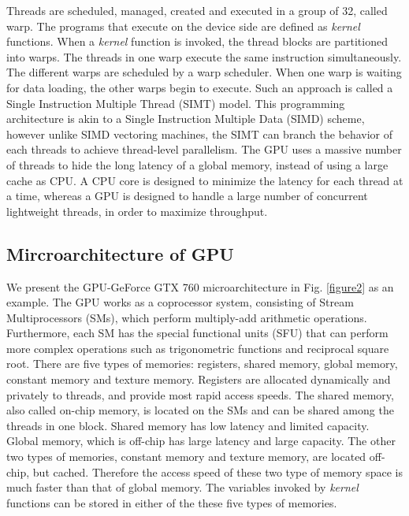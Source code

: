 \documentclass[letterpaper, 10pt, conference]{ieeeconf}
\begin{document}
Threads are scheduled, managed, created and executed in a group of 32, called warp. The programs that execute on the device side are defined as \textit{kernel} functions. When a \textit{kernel} function is invoked, the thread blocks are partitioned into warps. The threads in one warp execute the same instruction simultaneously. The different warps are scheduled by a warp scheduler. When one warp is waiting for data loading, the other warps begin to execute. Such an approach is called a Single Instruction Multiple Thread (SIMT) model. This programming architecture is akin to a Single Instruction Multiple Data (SIMD) scheme, however unlike SIMD vectoring machines, the SIMT can branch the behavior of each threads to achieve thread-level parallelism. The GPU uses a massive number of threads to hide the long latency of a global memory, instead of using a large cache as CPU. A CPU core is designed to minimize the latency for each thread at a time, whereas a GPU is designed to handle a large number of concurrent lightweight threads, in order to maximize throughput.
\subsection{Mircroarchitecture of GPU} 
We present the GPU-GeForce GTX 760 microarchitecture in Fig. \ref{figure2} as an example. The GPU works as a coprocessor system, consisting of Stream Multiprocessors (SMs), which perform multiply-add arithmetic operations. Furthermore, each SM has the special functional units (SFU) that can perform more complex operations such as trigonometric functions and reciprocal square root. There are five types of memories: registers, shared memory, global memory, constant memory and texture memory. Registers are allocated dynamically and privately to threads, and provide most rapid access speeds. The shared memory, also called on-chip memory, is located on the SMs and can be shared among the threads in one block. Shared memory has low latency and limited capacity. Global memory, which is off-chip has large latency and large capacity. The other two types of memories, constant memory and texture memory, are located off-chip, but cached. Therefore the access speed of these two type of memory space is much faster than that of global memory. The variables invoked by \textit{kernel} functions can be stored in either of the these five types of memories.
\end{document}
